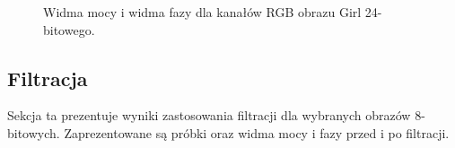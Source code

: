 \documentclass{classrep}
\begin{document}
\begin{figure}[H]
    \qquad
    \qquad
    \qquad
    \caption{Widma mocy i widma fazy dla kanałów RGB obrazu Girl 24-bitowego.}%
\end{figure} 

\subsection{Filtracja}
Sekcja ta prezentuje wyniki zastosowania filtracji dla wybranych obrazów 8-bitowych. Zaprezentowane są próbki oraz widma mocy i fazy przed i po filtracji. 
\end{document}
